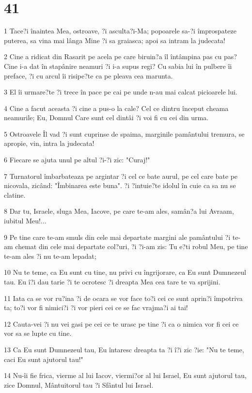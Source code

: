 \chapter{41}

\par 1 Tace?i înaintea Mea, ostroave, ?i asculta?i-Ma; popoarele sa-?i împrospateze puterea, sa vina mai lânga Mine ?i sa graiasca; apoi sa intram la judecata!
\par 2 Cine a ridicat din Rasarit pe acela pe care biruin?a îl întâmpina pas cu pas? Cine i-a dat în stapânire neamuri ?i i-a supus regi? Cu sabia lui în pulbere îi preface, ?i cu arcul îi risipe?te ca pe pleava cea marunta.
\par 3 El îi urmare?te ?i trece în pace pe cai pe unde n-au mai calcat picioarele lui.
\par 4 Cine a facut aceasta ?i cine a pus-o la cale? Cel ce dintru început cheama neamurile; Eu, Domnul Care sunt cel dintâi ?i voi fi cu cei din urma.
\par 5 Ostroavele Îl vad ?i sunt cuprinse de spaima, marginile pamântului tremura, se apropie, vin, intra la judecata!
\par 6 Fiecare se ajuta unul pe altul ?i-?i zic: "Curaj!"
\par 7 Turnatorul îmbarbateaza pe argintar ?i cel ce bate aurul, pe cel care bate pe nicovala, zicând: "Îmbinarea este buna". ?i ?intuie?te idolul în cuie ca sa nu se clatine.
\par 8 Dar tu, Israele, sluga Mea, Iacove, pe care te-am ales, samân?a lui Avraam, iubitul Meu!...
\par 9 Pe tine care te-am smuls din cele mai departate margini ale pamântului ?i te-am chemat din cele mai departate col?uri, ?i ?i-am zis: Tu e?ti robul Meu, pe tine te-am ales ?i nu te-am lepadat;
\par 10 Nu te teme, ca Eu sunt cu tine, nu privi cu îngrijorare, ca Eu sunt Dumnezeul tau. Eu î?i dau tarie ?i te ocrotesc ?i dreapta Mea cea tare te va sprijini.
\par 11 Iata ca se vor ru?ina ?i de ocara se vor face to?i cei ce sunt aprin?i împotriva ta; to?i vor fi nimici?i ?i vor pieri cei ce se fac vrajma?i ai tai!
\par 12 Cauta-vei ?i nu vei gasi pe cei ce te urasc pe tine ?i ca o nimica vor fi cei ce vor sa se lupte cu tine.
\par 13 Ca Eu sunt Dumnezeul tau, Eu întaresc dreapta ta ?i î?i zic ?ie: "Nu te teme, caci Eu sunt ajutorul tau!"
\par 14 Nu-îi fie frica, vierme al lui Iacov, viermi?or al lui Israel, Eu sunt ajutorul tau, zice Domnul, Mântuitorul tau ?i Sfântul lui Israel.
